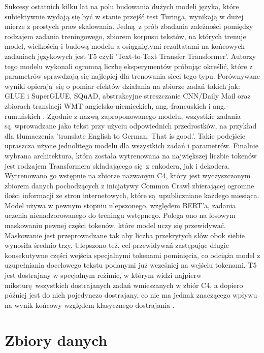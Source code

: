 Sukcesy ostatnich kilku lat na polu budowania dużych modeli języka, które subiektywnie wydają się być w stanie przejść test Turinga, wynikają w dużej mierze z prostych praw skalowania. Jedną z prób zbadania zależności pomiędzy rodzajem zadania treningowego, zbiorem korpusu tekstów, na których trenuje model, wielkością i budową modelu a osiągniętymi rezultatami na końcowych zadaniach językowych jest T5 czyli 'Text-to-Text Transfer Transformer'. Autorzy tego modelu wykonali ogromną liczbę eksperymentów próbując określić, które z parametrów sprawdzają się najlepiej dla trenowania sieci tego typu. Porównywane wyniki opierają się o pomiar efektów działania na zbiorze zadań takich jak: GLUE i SuperGLUE, SQuAD, abstrakcyjne streszczanie CNN/Daily Mail oraz zbiorach translacji WMT angielsko-niemieckich, ang.-francuskich i ang.-rumuńskich \autocite{raffel2020exploring}. Zgodnie z nazwą zaproponowanego modelu, wszystkie zadania są wprowadzane jako tekst przy użyciu odpowiednich przedrostków, na przykład dla tłumaczenia 'translate English to German: That is good.'. Takie podejście upraszcza użycie jednolitego modelu dla wszystkich zadań i parametrów. Finalnie wybrana architektura, która została wytrenowana na największej liczbie tokenów jest rodzajem Transformera składającego się z enkodera, jak i dekodera. Wytrenowano go wstępnie na zbiorze nazwanym C4, który jest wyczyszczonym zbiorem danych pochodzących z inicjatywy Common Crawl zbierającej ogromne ilości informacji ze stron internetowych, które są upubliczniane każdego miesiąca. Model używa w pewnym stopniu ulepszonego, względem BERT'a, zadania uczenia nienadzorowanego do treningu wstępnego. Polega ono na losowym maskowaniu pewnej części tokenów, które model uczy się przewidywać. Maskowanie jest przeprowadzane tak aby liczba przekrytych słów obok siebie wynosiła średnio trzy. Ulepszono też, cel przewidywań zastępując długie konsekutywne części wejścia specjalnymi tokenami pominięcia, co odciąża model z uzupełniania docelowego tekstu podanymi już wcześniej na wejściu tokenami. T5 jest dostrajany w specjalnym reżimie, w którym widzi najpierw miksturę wszystkich dostrajanych zadań wmieszanych w zbiór C4, a dopiero później jest do nich pojedynczo dostrajany, co nie ma jednak znaczącego wpływu na wynik końcowy względem klasycznego dostrajania \autocite{raffel2020exploring}.

\section{Zbiory danych}

